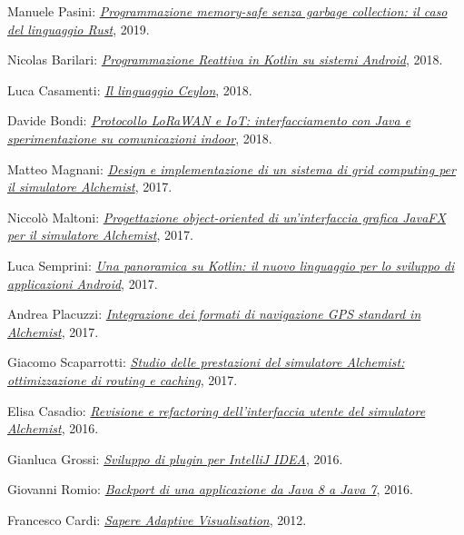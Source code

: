 \begin{outerlist}
\begin{innerlist}
      \item Manuele Pasini: \href{http://amslaurea.unibo.it/18535/}{\textit{Programmazione memory-safe senza garbage collection: il caso del linguaggio Rust}}, 2019.
      \item Nicolas Barilari: \href{http://amslaurea.unibo.it/16841/}{\textit{Programmazione Reattiva in Kotlin su sistemi Android}}, 2018.
      \item Luca Casamenti: \href{http://amslaurea.unibo.it/16788/}{\textit{Il linguaggio Ceylon}}, 2018.
      \item Davide Bondi: \href{http://amslaurea.unibo.it/15730/}{\textit{Protocollo LoRaWAN e IoT: interfacciamento con Java e sperimentazione su comunicazioni indoor}}, 2018.
      \item Matteo Magnani: \href{http://amslaurea.unibo.it/17133/}{\textit{Design e implementazione di un sistema di grid computing per il simulatore Alchemist}}, 2017.
      \item Niccolò Maltoni: \href{http://amslaurea.unibo.it/14682/}{\textit{Progettazione object-oriented di un'interfaccia grafica JavaFX per il simulatore Alchemist}}, 2017.
      \item Luca Semprini: \href{http://amslaurea.unibo.it/14673/}{\textit{Una panoramica su Kotlin: il nuovo linguaggio per lo sviluppo di applicazioni Android}}, 2017.
      \item Andrea Placuzzi: \href{http://amslaurea.unibo.it/14329/}{\textit{Integrazione dei formati di navigazione GPS standard in Alchemist}}, 2017.
      \item Giacomo Scaparrotti: \href{http://amslaurea.unibo.it/14019/}{\textit{Studio delle prestazioni del simulatore Alchemist: ottimizzazione di routing e caching}}, 2017.
      \item Elisa Casadio: \href{http://amslaurea.unibo.it/12310/}{\textit{Revisione e refactoring dell'interfaccia utente del simulatore Alchemist}}, 2016.
      \item Gianluca Grossi: \href{http://amslaurea.unibo.it/12503/}{\textit{Sviluppo di plugin per IntelliJ IDEA}}, 2016.
      \item Giovanni Romio: \href{http://amslaurea.unibo.it/10481/}{\textit{Backport di una applicazione da Java 8 a Java 7}}, 2016.
      \item Francesco Cardi: \href{http://archive.fo/zMGo8}{\textit{Sapere Adaptive Visualisation}}, 2012.
    \end{innerlist}
\end{outerlist}
\halfblankline

